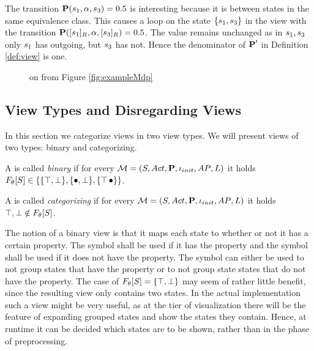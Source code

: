 \documentclass[preview]{standalone}
\begin{document}
\begin{exmp}
The transition ${{\textbf{P}}}({s}_1,{\alpha},{s}_3) = 0.5$ is interesting because it is between states in the same equivalence class. This causes a loop on the state $\{{s}_1,{s}_3\}$ in the view \view with the transition ${{\textbf{P}}}({{[{s}_1]_{{R}}}},{\alpha},{{[{s}_3]_{{R}}}}) = 0.5$. The value remains unchanged as in ${s}_1,{s}_3$ only ${s}_1$ has \action outgoing, but ${s}_3$ has not. Hence the denominator of ${{\textbf{P}}}'$ in Definition \ref{def:view} is one.

\begin{figure}[!htb]
	\centering 
	\caption{\viewNC \view on \chgphN \chgph from Figure \ref{fig:exampleMdp}}
	\label{fig:exampleView}  
\end{figure}
\end{exmp}

\subsection{View Types and Disregarding Views}
In this section we categorize views in two view types. We will present views of two types: binary and categorizing.

\begin{definition}
	\sloppy
	A \viewN \view is called \emph{binary} if for every \chgphN ${{{\mathcal{M}}}} = {{({S}, {Act}, {\textbf{P}}, {\iota_{init}}, {AP}, {L})}}$ it holds ${{F_{{\theta}}}}[{S}] \in \{\{{\top}, {\bot}\}, \{{\bullet}, {\bot}\}, \{{\top}\, {\bullet}\}\}$. 
	
	\noindent
	A \viewN \view is called \emph{categorizing} if for every \chgphN ${{{\mathcal{M}}}} = {{({S}, {Act}, {\textbf{P}}, {\iota_{init}}, {AP}, {L})}}$ it holds ${\top}, {\bot} \notin {\ensuremath{{F_{{\theta}}}}}[{S}]$. 
	\label{def:viewtypes}
\end{definition}

The notion of a binary view is that it maps each state to whether or not it has a certain property. The symbol \hasppty shall be used if it has the property and the symbol \notppty shall be used if it does not have the property. The symbol \remelem can either be used to not group states that have the property or to not group state states that do not have the property. The case of ${{F_{{\theta}}}}[{S}] = \{{\top}, {\bot}\}$ may seem of rather little benefit, since the resulting view only contains two states. In the actual implementation such a view might be very useful, as at the tier of visualization there will be the feature of expanding grouped states and show the states they contain. Hence, at runtime it can be decided which states are to be shown, rather than in the phase of preprocessing.
\end{document}
